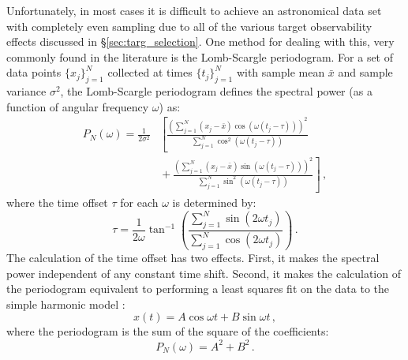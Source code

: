 Unfortunately, in most cases it is difficult to achieve an astronomical data set with completely even sampling due to all of the various target observability effects discussed in \S\ref{sec:targ_selection}.  One method  for dealing with this, very commonly found in the literature \citep{black1982, scargle1982, cumming2003, sozzetti2005, cumming2008} is the Lomb-Scargle periodogram.  For a set of data points $\{x_j\}_{j=1}^N$ collected at times $\{t_j\}_{j=1}^N$ with sample mean $\bar x$ and sample variance $\sigma^2$, the Lomb-Scargle periodogram defines the spectral power (as a function of angular frequency $\omega$) as:
\begin{equation}
\begin{split}
P_N(\omega) = \frac{1}{2\sigma^2} &\left[ \frac{\left(\sum_{j=1}^N \left( x_j - \bar x\right) \cos\left(\omega(t_j - \tau)\right)\right)^2}{\sum_{j=1}^N \cos^2\left(\omega(t_j - \tau)\right)}\right.\\
&\left.{} + \frac{\left(\sum_{j=1}^N \left( x_j - \bar x\right) \sin\left(\omega(t_j - \tau)\right)\right)^2}{\sum_{j=1}^N \sin^2\left(\omega(t_j - \tau)\right)}\right] \,,
\end{split}
\end{equation}
where the time offset $\tau$ for each $\omega$ is determined by:
\begin{equation}
\tau = \frac{1}{2\omega}\tan^{-1}\left(\frac{\sum_{j=1}^N \sin\left(2 \omega t_j\right)}{\sum_{j=1}^N \cos\left(2 \omega t_j\right)}\right) \,.
\end{equation}
The calculation of the time offset has two effects.  First, it makes the spectral power independent of any constant time shift.  Second, it makes the calculation of the periodogram equivalent to performing a least squares fit on the data to the simple harmonic model \citep{lomb1976least}:
\begin{equation}
x(t) = A \cos \omega t + B \sin \omega t \,,
\end{equation}
where the periodogram is the sum of the square of the coefficients:
\begin{equation}
P_N(\omega) = A^2 + B^2 \,.
\end{equation}

